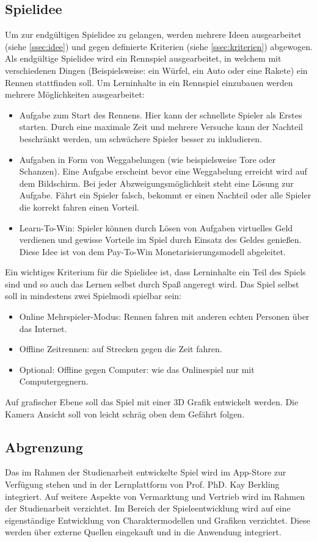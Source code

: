 \subsection{Spielidee}\label{ssec:spielidee}
	Um zur endgültigen Spielidee zu gelangen, werden mehrere Ideen ausgearbeitet (siehe \ref{ssec:idee}) und gegen definierte Kriterien (siehe \ref{ssec:kriterien}) abgewogen.
	Als endgültige Spielidee wird ein Rennspiel ausgearbeitet, in welchem mit verschiedenen Dingen (Beispielsweise: ein Würfel, ein Auto oder eine Rakete) ein Rennen stattfinden soll. Um Lerninhalte in ein Rennspiel einzubauen werden mehrere Möglichkeiten ausgearbeitet:
	\begin{itemize}
		\item{ Aufgabe zum Start des Rennens. Hier kann der schnellste Spieler als Erstes starten. Durch eine maximale Zeit und mehrere Versuche kann der Nachteil beschränkt werden, um schwächere Spieler besser zu inkludieren. }
		\item{ Aufgaben in Form von Weggabelungen (wie beispielsweise Tore oder Schanzen). Eine Aufgabe erscheint bevor eine Weggabelung erreicht wird auf dem Bildschirm. Bei jeder Abzweigungsmöglichkeit steht eine Lösung zur Aufgabe. Fährt ein Spieler falsch, bekommt er einen Nachteil oder alle Spieler die korrekt fahren einen Vorteil. }
		\item{ Learn-To-Win: Spieler können durch Lösen von Aufgaben virtuelles Geld verdienen und gewisse Vorteile im Spiel durch Einsatz des Geldes genießen. Diese Idee ist von dem Pay-To-Win Monetarisierungsmodell abgeleitet. }
	\end{itemize}
	Ein wichtiges Kriterium für die Spielidee ist, dass Lerninhalte ein Teil des Spiels sind und so auch das Lernen selbst durch Spaß angeregt wird.
	Das Spiel selbst soll in mindestens zwei Spielmodi spielbar sein:
	\begin{itemize}
		\item{ Online Mehrspieler-Modus: Rennen fahren mit anderen echten Personen über das Internet. }
		\item{ Offline Zeitrennen: auf Strecken gegen die Zeit fahren. }
		\item{ Optional: Offline gegen Computer: wie das Onlinespiel nur mit Computergegnern. }
	\end{itemize}
	Auf grafischer Ebene soll das Spiel mit einer 3D Grafik entwickelt werden. Die Kamera Ansicht soll von leicht schräg oben dem Gefährt folgen.

\subsection{Abgrenzung}
	Das im Rahmen der Studienarbeit entwickelte Spiel wird im App-Store zur Verfügung stehen und in der Lernplattform von Prof. PhD. Kay Berkling integriert. Auf weitere Aspekte von Vermarktung und Vertrieb wird im Rahmen der Studienarbeit verzichtet.
	Im Bereich der Spieleentwicklung wird auf eine eigenständige Entwicklung von Charaktermodellen und Grafiken verzichtet. Diese werden über externe Quellen eingekauft und in die Anwendung integriert.

